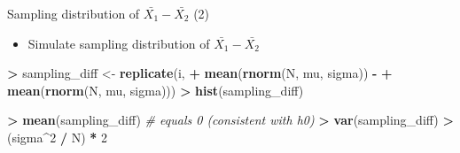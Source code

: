 \documentclass[
  ignorenonframetext,
]{beamer}
\newenvironment{Shaded}{\begin{snugshade}}{\end{snugshade}}
\newcommand{\CommentTok}[1]{\textcolor[rgb]{0.56,0.35,0.01}{\textit{#1}}}
\newcommand{\DecValTok}[1]{\textcolor[rgb]{0.00,0.00,0.81}{#1}}
\newcommand{\FunctionTok}[1]{\textcolor[rgb]{0.13,0.29,0.53}{\textbf{#1}}}
\newcommand{\NormalTok}[1]{#1}
\newcommand{\OtherTok}[1]{\textcolor[rgb]{0.56,0.35,0.01}{#1}}
\newcommand{\SpecialCharTok}[1]{\textcolor[rgb]{0.81,0.36,0.00}{\textbf{#1}}}
\providecommand{\tightlist}{%
  \setlength{\itemsep}{0pt}\setlength{\parskip}{0pt}}
\begin{document}
\begin{frame}[fragile]{Sampling distribution of
\(\bar{X_1} - \bar{X_2}\) (2)}
\label{sampling-distribution-of-barx_1---barx_2-2}
\begin{itemize}
\tightlist
\item
  Simulate sampling distribution of \(\bar{X_1} - \bar{X_2}\)
\end{itemize}

\begin{Shaded}
\begin{Highlighting}[]
\SpecialCharTok{\textgreater{}}\NormalTok{ sampling\_diff }\OtherTok{\textless{}{-}} \FunctionTok{replicate}\NormalTok{(i,}
\SpecialCharTok{+}                            \FunctionTok{mean}\NormalTok{(}\FunctionTok{rnorm}\NormalTok{(N, mu, sigma)) }\SpecialCharTok{{-}}
\SpecialCharTok{+}                            \FunctionTok{mean}\NormalTok{(}\FunctionTok{rnorm}\NormalTok{(N, mu, sigma)))}
\SpecialCharTok{\textgreater{}} \FunctionTok{hist}\NormalTok{(sampling\_diff)}
\end{Highlighting}
\end{Shaded}

\begin{Shaded}
\begin{Highlighting}[]
\SpecialCharTok{\textgreater{}} \FunctionTok{mean}\NormalTok{(sampling\_diff) }\CommentTok{\# equals 0 (consistent with h0)}
\SpecialCharTok{\textgreater{}} \FunctionTok{var}\NormalTok{(sampling\_diff)}
\SpecialCharTok{\textgreater{}}\NormalTok{ (sigma}\SpecialCharTok{\^{}}\DecValTok{2} \SpecialCharTok{/}\NormalTok{ N) }\SpecialCharTok{*} \DecValTok{2}
\end{Highlighting}
\end{Shaded}
\end{frame}
\end{document}
